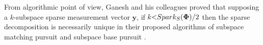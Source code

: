 From algorithmic point of view, Ganesh and his colleagues proved that supposing a $k$-subspace sparse measurement vector $\boldsymbol{y}$, if $k {<} Spark_S(\boldsymbol{\Phi}) / 2$ then the sparse decomposition is necessarily unique in their proposed algorithms of subspace matching pursuit and subspace base pursuit \cite{Ganesh2009}.